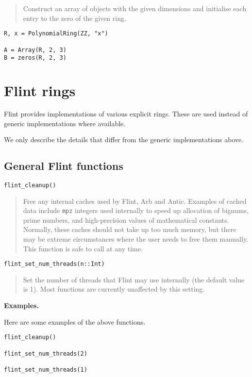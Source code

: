 \documentclass[a4paper,10pt]{article}
\newcommand{\code}{\lstinline}
\newcommand{\desc}[1]{\vspace{-3mm}\begin{quote}#1\end{quote}}
\begin{document}
\desc{Construct an array of objects with the given dimensions and initialise each
entry to the zero of the given ring.}

\begin{lstlisting}
R, x = PolynomialRing(ZZ, "x")

A = Array(R, 2, 3)
B = zeros(R, 2, 3)
\end{lstlisting}

\section{Flint rings}

Flint provides implementations of various explicit rings. These are used instead of generic
implementations where available.

We only describe the details that differ from the generic implementations above.

\subsection{General Flint functions}

\begin{lstlisting}
flint_cleanup()
\end{lstlisting}

\desc{Free any internal caches used by Flint, Arb and Antic.
Examples of cached data include \code{mpz} integers used internally
to speed up allocation of bignums,
prime numbers, and high-precision values of mathematical constants.
Normally, these caches should not take up too much memory, but there may
be extreme circumstances where the user needs to free them manually.
This function is safe to call at any time.}

\begin{lstlisting}
flint_set_num_threads(n::Int)
\end{lstlisting}

\desc{Set the number of threads that Flint may use internally (the default
value is 1). Most functions are currently unaffected by this setting.}

\textbf{Examples.}

Here are some examples of the above functions.

\begin{lstlisting}
flint_cleanup()

flint_set_num_threads(2)

flint_set_num_threads(1)
\end{lstlisting}
\end{document}

